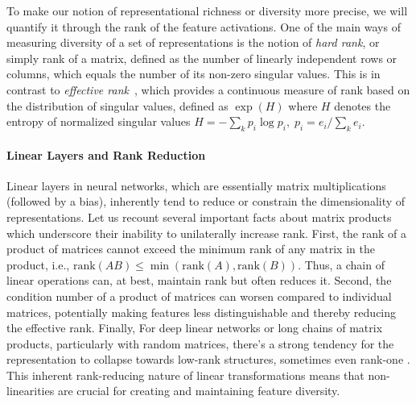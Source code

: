 \documentclass{article}
\newcommand{\GIU}[1]{\todo[color=purple!30,size=\tiny]{GIU: #1}}
\numberwithin{figure}{section}
\begin{document}
To make our notion of representational richness or diversity more precise, we will quantify it through the rank of the feature activations. 
One of the main ways of measuring diversity of a set of representations is the notion of \emph{hard rank}, or simply rank of a matrix, defined as the number of linearly independent rows or columns, which equals the number of its non-zero singular values. 
This is in contrast to \emph{effective rank}~\citep{dohare2024loss}, which provides a continuous measure of rank based on the distribution of singular values, defined as $\exp(H)$ where $H$ denotes the entropy of normalized singular values $H = -\sum_k p_i \log p_i, \; p_i = e_i/\sum_k e_i.$ 



\paragraph{Linear Layers and Rank Reduction}
Linear layers in neural networks, which are essentially matrix multiplications (followed by a bias), inherently tend to reduce or constrain the dimensionality of representations. Let us recount several important facts about matrix products which underscore their inability to unilaterally increase rank. First, the rank of a product of matrices cannot exceed the minimum rank of any matrix in the product, i.e., $\mathrm{rank}(AB) \le \min(\mathrm{rank}(A), \mathrm{rank}(B))$. Thus, a chain of linear operations can, at best, maintain rank but often reduces it. Second, the condition number of a product of matrices can worsen compared to individual matrices, potentially making features less distinguishable and thereby reducing the effective rank. Finally,  For deep linear networks or long chains of matrix products, particularly with random matrices, there's a strong tendency for the representation to collapse towards low-rank structures, sometimes even rank-one \citep{saxe2014exact, furstenberg1963noncommuting}.
This inherent rank-reducing nature of linear transformations means that non-linearities are crucial for creating and maintaining feature diversity.
\end{document}
